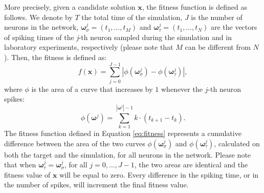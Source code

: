 \documentclass[utf8]{frontiersFPHY} %
\begin{document}
More precisely, given a candidate solution $\textbf{x}$, the fitness function is defined as follows. 
We denote by $T$ the total time of the simulation,  $J$ is the number of neurons in the network, $\boldsymbol{\omega}_{\sigma}^j = (t_1, \dots, t_M)$ and $\boldsymbol{\omega}_{\tau}^j = (t_1, \dots, t_N)$ are the vectors of spiking times of the \textit{j}-th neuron sampled during the simulation and in laboratory experiments, respectively (please note that $M$ can be different from $N$). 
Then, the fitness is defined as:
\begin{equation}
f(\textbf{x}) = \displaystyle \sum_{j=0}^{J-1} \left|\phi(\boldsymbol{\omega}_{\sigma}^j) - \phi(\boldsymbol{\omega}_{\tau}^j)\right|,
\label{eq:fitness}
\end{equation}
where $\phi$ is the area of a curve that increases by $1$ whenever the $j$-th neuron spikes:
\begin{equation}
    \phi(\boldsymbol{\omega}^j) = \sum_{k=1}^{|\boldsymbol{\omega}^j|-1} k \cdot ( t_{k+1} - t_k ).
\end{equation}
The fitness function defined in Equation \ref{eq:fitness} represents a cumulative difference between the area of the two curves $\phi(\boldsymbol{\omega}^j_{\sigma})$ and $\phi(\boldsymbol{\omega}^j_{\tau})$, calculated on both the target and the simulation, for all neurons in the network. 
Please note that when $\boldsymbol{\omega}_{\tau}^j = \boldsymbol{\omega}_{\sigma}^j$, for all $j=0, \dots, J-1$,  the two areas are identical and the fitness value of $\textbf{x}$ will be equal to zero.
Every difference in the spiking time, or in the number of spikes, will increment the final fitness value.
\end{document}
